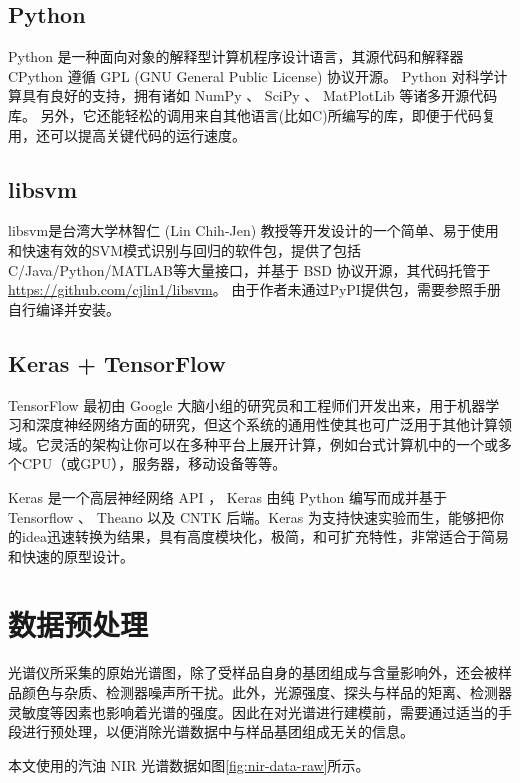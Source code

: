 \documentclass[a4paper]{article}
\begin{document}
		\subsection{Python}
			Python 是一种面向对象的解释型计算机程序设计语言，其源代码和解释器 CPython 遵循 GPL (GNU General Public License) 协议开源。
			Python 对科学计算具有良好的支持，拥有诸如 NumPy 、 SciPy 、 MatPlotLib 等诸多开源代码库。
			另外，它还能轻松的调用来自其他语言(比如C)所编写的库，即便于代码复用，还可以提高关键代码的运行速度。
		\subsection{libsvm}
			libsvm是台湾大学林智仁 (Lin Chih-Jen) 教授等开发设计的一个简单、易于使用和快速有效的SVM模式识别与回归的软件包，提供了包括C/Java/Python/MATLAB等大量接口，并基于 BSD 协议开源，其代码托管于\url{https://github.com/cjlin1/libsvm}。
			由于作者未通过PyPI提供包，需要参照手册自行编译并安装。
		\subsection{Keras + TensorFlow}
			TensorFlow 最初由 Google 大脑小组的研究员和工程师们开发出来，用于机器学习和深度神经网络方面的研究，但这个系统的通用性使其也可广泛用于其他计算领域。它灵活的架构让你可以在多种平台上展开计算，例如台式计算机中的一个或多个CPU（或GPU），服务器，移动设备等等。
			
			Keras 是一个高层神经网络 API ， Keras 由纯 Python 编写而成并基于 Tensorflow 、 Theano 以及 CNTK 后端。Keras 为支持快速实验而生，能够把你的idea迅速转换为结果，具有高度模块化，极简，和可扩充特性，非常适合于简易和快速的原型设计。
			
	\section{数据预处理}
		光谱仪所采集的原始光谱图，除了受样品自身的基团组成与含量影响外，还会被样品颜色与杂质、检测器噪声所干扰。此外，光源强度、探头与样品的矩离、检测器灵敏度等因素也影响着光谱的强度。因此在对光谱进行建模前，需要通过适当的手段进行预处理，以便消除光谱数据中与样品基团组成无关的信息。
		
		本文使用的汽油 NIR 光谱数据如图\ref{fig:nir-data-raw}所示。
		
\end{document}
